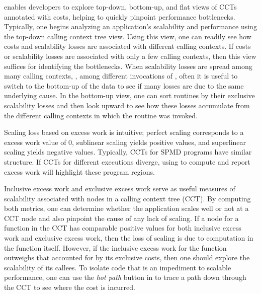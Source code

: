 \documentclass[11pt,twoside,letterpaper]{report}
\begin{document}
\hpcviewer{} enables developers to explore top-down, bottom-up, and flat views of CCTs annotated with costs, helping to quickly pinpoint performance bottlenecks.
Typically, one begins analyzing an application's scalability and performance using the top-down calling context tree view.
Using this view, one can readily see how costs and scalability losses are associated with different calling contexts.
If costs or scalability losses are associated with only a few calling contexts, then this view suffices for identifying the bottlenecks.
When scalability losses are spread among many calling contexts, \eg, among different invocations of , often it is useful to switch to the bottom-up of the data to see if many losses are due to the same underlying cause.
In the bottom-up view, one can sort routines by their exclusive scalability losses and then look upward to see how these losses accumulate from the different calling contexts in which the routine was invoked.

Scaling loss based on excess work is intuitive; perfect scaling corresponds to a excess work value of $0$, sublinear scaling yields positive values, and superlinear scaling yields negative values.
Typically, CCTs for SPMD programs have similar structure.
If CCTs for different executions diverge, using \hpcviewer{} to compute and report excess work will highlight these program regions.

Inclusive excess work and exclusive excess work serve as useful measures of scalability associated with nodes in a calling context tree (CCT).
By computing both metrics, one can determine whether the application scales well or not at a CCT node and also pinpoint the cause of any lack of scaling.
If a node for a function in the CCT has comparable positive values for both inclusive excess work and exclusive excess work, then the loss of scaling is due to computation in the function itself.
However, if the inclusive excess work for the function outweighs that accounted for by its exclusive costs, then one should explore the scalability of its callees.
To isolate code that is an impediment to scalable performance, one can use the {\em hot path} button in \hpcviewer{} to trace a path down through the CCT to see where the cost is incurred.



\end{document}
